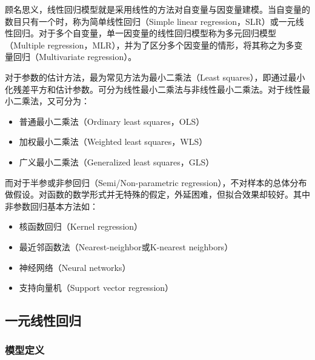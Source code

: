 \documentclass[11pt]{article}
\begin{document}
顾名思义，线性回归模型就是采用线性的方法对自变量与因变量建模。当自变量的数目只有一个时，称为简单线性回归（Simple linear regression，SLR）或一元线性回归。对于多个自变量，单一因变量的线性回归模型称为多元回归模型（Multiple regression，MLR），并为了区分多个因变量的情形，将其称之为多变量回归（Multivariate regression）。

对于参数的估计方法，最为常见方法为最小二乘法（Least squares），即通过最小化残差平方和估计参数。可分为线性最小二乘法与非线性最小二乘法。对于线性最小二乘法，又可分为：
\begin{itemize}
    \item 普通最小二乘法（Ordinary least squares，OLS）
    \item 加权最小二乘法（Weighted least squares，WLS）
    \item 广义最小二乘法（Generalized least squares，GLS）
\end{itemize}

而对于半参或非参回归（Semi/Non-parametric regression），不对样本的总体分布做假设。对函数的数学形式并无特殊的假定，外延困难，但拟合效果却较好。其中非参数回归基本方法如：
\begin{itemize}
    \item 核函数回归（Kernel regression）
    \item 最近邻函数法（Nearest-neighbor或K-nearest neighbors）
    \item 神经网络（Neural networks）
    \item 支持向量机（Support vector regression）
\end{itemize}

\subsection{一元线性回归}

\subsubsection{模型定义}
\end{document}
